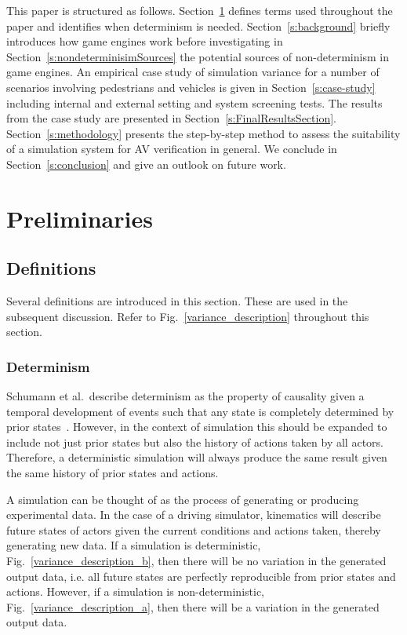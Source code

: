 This paper is structured as follows.
%
Section~\ref{s:prelim} defines terms used throughout the paper and identifies when determinism is needed. 
Section~\ref{s:background} briefly introduces how game engines work before investigating in Section~\ref{s:nondeterminisimSources} the potential sources of non-determinism in game engines.
%
An empirical case study of simulation variance for a number of scenarios involving pedestrians and vehicles is given in Section~\ref{s:case-study} including internal and external setting and system screening tests. 
%
The results from the case study are presented in Section~\ref{s:FinalResultsSection}. 
%
Section~\ref{s:methodology} presents the step-by-step method to assess the suitability of a simulation system for AV verification in general. 
%
We conclude in Section~\ref{s:conclusion} and give an outlook on future work.


\section{Preliminaries} \label{s:prelim}
\subsection{Definitions}
Several definitions are introduced in this section. These are used in the subsequent discussion. Refer to Fig.~\ref{variance_description} throughout this section.
\\

\subsubsection{Determinism}
Schumann et al.\ describe determinism as the property of causality given a temporal development of events such that any state is completely determined by prior states~\cite{Schumann2010}. However, in the context of simulation this should be expanded to include not just prior states but also the history of actions taken by all actors. Therefore, a deterministic simulation will always produce the same result given the same history of prior states and actions.

A simulation can be thought of as the process of generating or producing experimental data. In the case of a driving simulator, kinematics will describe future states of actors given the current conditions and actions taken, thereby generating new data. If a simulation is deterministic, Fig.~\ref{variance_description_b}, then there will be no variation in the generated output data, i.e. all future states are perfectly reproducible from prior states and actions. However, if a simulation is non-deterministic, Fig.~\ref{variance_description_a}, then there will be a variation in the generated output data. \\


